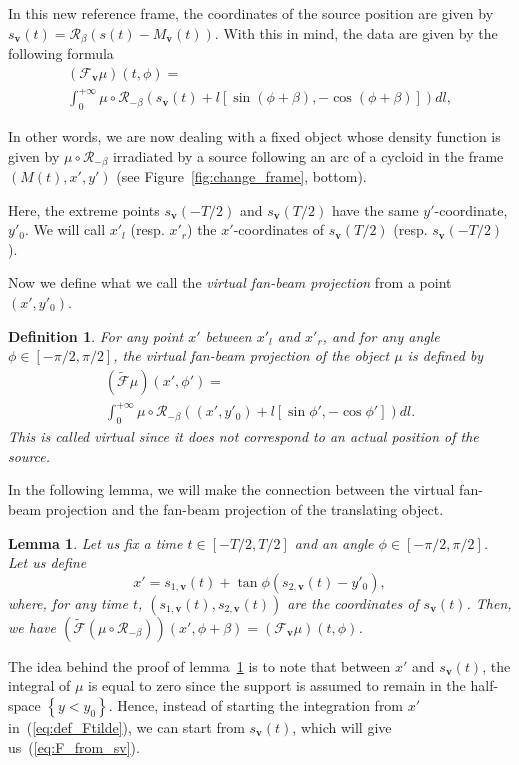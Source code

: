 \documentclass[twocolumn]{IEEEtran}
\newcommand{\bv}{\mathbf{v}}
\newcommand{\Mbv}{M_{\mathbf{v}}}
\newcommand{\Tbv}{\mathcal{F}_{\mathbf{v}}}
\newcommand{\sbv}{s_{\mathbf{v}}}
\newtheorem{definition}{Definition}
\newtheorem{lemma}{Lemma}
\begin{document}
In this new reference frame, the coordinates of the source position are given by $\sbv(t)=\mathcal{R}_{\beta} \left( s(t)-\Mbv(t) \right)$. With this in mind, the data are given by the following formula
\begin{multline}
	(\Tbv\mu)(t,\phi) = \\
	\int_0^{+\infty} \mu \circ \mathcal{R}_{-\beta} \left( s_{\bv}(t) + l \left[ \sin (\phi + \beta), -\cos (\phi + \beta) \right] \right) dl,
\label{eq:F_from_sv}
\end{multline}

In other words, we are now dealing with a fixed object whose density function is given by $\mu \circ \mathcal{R}_{-\beta}$ irradiated by a source following an arc of a cycloid in the frame $\left(M(t), x', y'\right)$ (see Figure~\ref{fig:change_frame}, bottom).

Here, the extreme points $\sbv(-T/2)$ and $\sbv(T/2)$ have the same $y'$-coordinate, $y'_0$. We will call $x'_l$ (resp. $x'_r$) the $x'$-coordinates of $\sbv(T/2)$ (resp. $\sbv(-T/2)$).

Now we define what we call the \emph{virtual fan-beam projection} from a point $(x',y'_0)$.
\begin{definition}
	For any point $x'$ between $x'_l$ and $x'_r$, and for any angle $\phi \in \left[ -\pi/2, \pi/2\right]$, the \emph{virtual fan-beam projection} of the object $\mu$ is defined by
\begin{multline}
	\left( \tilde{\mathcal{F}} \mu	\right)(x',\phi') = \\
	\int_0^{+\infty} \mu \circ \mathcal{R}_{-\beta} \left( (x',y'_0) + l \left[ \sin \phi', -\cos \phi' \right] \right) dl.
\label{eq:def_Ftilde}
\end{multline}
This is called \emph{virtual} since it does not correspond to an actual position of the source.
\end{definition}

In the following lemma, we will make the connection between the virtual fan-beam projection and the fan-beam projection of the translating object.
\begin{lemma}
	Let us fix a time $t \in \left[ -T/2, T/2\right]$ and an angle $\phi \in \left[ -\pi/2, \pi/2\right]$. Let us define
	\begin{equation}
		x' = s_{1,\bv}(t) + \tan \phi \left( s_{2,\bv}(t) - y'_0 \right),
		\label{eq:x'}
	\end{equation}
	where, for any time $t$, $\left( s_{1,\bv}(t), s_{2,\bv}(t) \right)$ are the coordinates of $\sbv(t)$.
	Then, we have $\left( \tilde{\mathcal{F}} \left( \mu \circ \mathcal{R}_{-\beta} \right) \right)(x',\phi + \beta) = \left( \Tbv \mu \right)(t,\phi)$.
\label{lem:T_x_t}
\end{lemma}
The idea behind the proof of lemma~\ref{lem:T_x_t} is to note that between $x'$ and $\sbv(t)$, the integral of $\mu$ is equal to zero since the support is assumed to remain in the half-space $\left\{ y<y_0 \right\}$. Hence, instead of starting the integration from $x'$ in~(\ref{eq:def_Ftilde}), we can start from $\sbv(t)$, which will give us~(\ref{eq:F_from_sv}).
\end{document}
